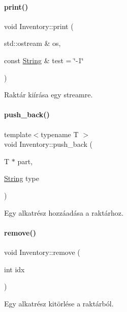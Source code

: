 \mbox{\label{class_inventory_ae141405ba9deea67f5c1be1850d136fe}} 
\paragraph{\texorpdfstring{print()}{print()}}
{\footnotesize\ttfamily void Inventory\+::print (\begin{DoxyParamCaption}\item[{std\+::ostream \&}]{os,  }\item[{const \mbox{\hyperlink{class_string}{String}} \&}]{test = {\ttfamily \char`\"{}-\/1\char`\"{}} }\end{DoxyParamCaption})}



Raktár kiírása egy streamre. 

\mbox{\label{class_inventory_a86dd14362d6cefb46d4e40667c44481c}} 
\paragraph{\texorpdfstring{push\_back()}{push\_back()}}
{\footnotesize\ttfamily template$<$typename T $>$ \\
void Inventory\+::push\+\_\+back (\begin{DoxyParamCaption}\item[{T $\ast$}]{part,  }\item[{\mbox{\hyperlink{class_string}{String}}}]{type }\end{DoxyParamCaption})}



Egy alkatrész hozzáadása a raktárhoz. 

\mbox{\label{class_inventory_a1f602317e97625523444591ac5bf8bd7}} 
\paragraph{\texorpdfstring{remove()}{remove()}}
{\footnotesize\ttfamily void Inventory\+::remove (\begin{DoxyParamCaption}\item[{int}]{idx }\end{DoxyParamCaption})}



Egy alkatrész kitörlése a raktárból. 

